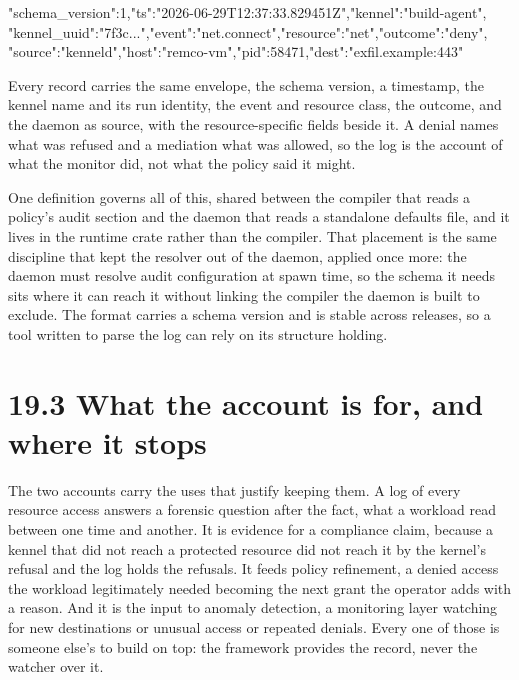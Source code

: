 \begin{kennelcode}
{"schema_version":1,"ts":"2026-06-29T12:37:33.829451Z","kennel":"build-agent",
 "kennel_uuid":"7f3c...","event":"net.connect","resource":"net","outcome":"deny",
 "source":"kenneld","host":"remco-vm","pid":58471,"dest":"exfil.example:443"}
\end{kennelcode}

Every record carries the same envelope, the schema version, a timestamp,
the kennel name and its run identity, the event and resource class, the
outcome, and the daemon as source, with the resource-specific fields
beside it. A denial names what was refused and a mediation what was
allowed, so the log is the account of what the monitor did, not what the
policy said it might.

One definition governs all of this, shared between the compiler that
reads a policy's audit section and the daemon that reads a standalone
defaults file, and it lives in the runtime crate rather than the
compiler. That placement is the same discipline that kept the resolver
out of the daemon, applied once more: the daemon must resolve audit
configuration at spawn time, so the schema it needs sits where it can
reach it without linking the compiler the daemon is built to exclude.
The format carries a schema version and is stable across releases, so a
tool written to parse the log can rely on its structure holding.

\hypertarget{what-the-account-is-for-and-where-it-stops}{%
\section{19.3 What the account is for, and where it
stops}\label{what-the-account-is-for-and-where-it-stops}}

The two accounts carry the uses that justify keeping them. A log of
every resource access answers a forensic question after the fact, what a
workload read between one time and another. It is evidence for a
compliance claim, because a kennel that did not reach a protected
resource did not reach it by the kernel's refusal and the log holds the
refusals. It feeds policy refinement, a denied access the workload
legitimately needed becoming the next grant the operator adds with a
reason. And it is the input to anomaly detection, a monitoring layer
watching for new destinations or unusual access or repeated denials.
Every one of those is someone else's to build on top: the framework
provides the record, never the watcher over it.

